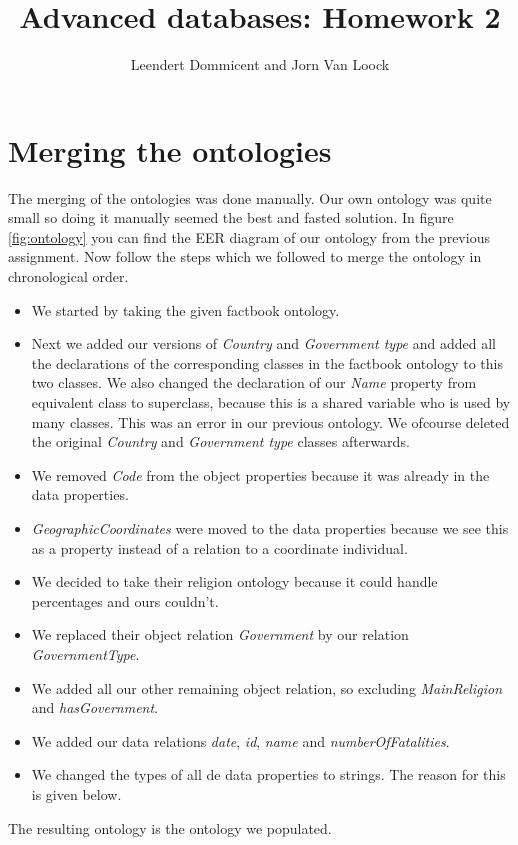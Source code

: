 \documentclass{article}
\title{Advanced databases: Homework 2}
\author{Leendert Dommicent and Jorn Van Loock}
\begin{document}
\maketitle
\section{Merging the ontologies}
The merging of the ontologies was done manually. Our own ontology was quite small so doing it manually seemed the best and fasted solution. In figure \ref{fig:ontology} you can find the EER diagram of our ontology from the previous assignment. Now follow the steps which we followed to merge the ontology in chronological order.
\begin{itemize}
\item We started by taking the given factbook ontology.
\item Next we added our versions of \textit{Country} and \textit{Government type} and added all the declarations of the corresponding classes in the factbook ontology to this two classes. We also changed the declaration of our \textit{Name} property from equivalent class to superclass, because this is a shared variable who is used by many classes. This was an error in our previous ontology. We ofcourse deleted the original \textit{Country} and \textit{Government type} classes afterwards.
\item We removed \textit{Code} from the object properties because it was already in the data properties.
\item \textit{GeographicCoordinates} were moved to the data properties because we see this as a property instead of a relation to a coordinate individual.
\item We decided to take their religion ontology because it could handle percentages and ours couldn't.
\item We replaced their object relation \textit{Government} by our relation \textit{GovernmentType}.
\item We added all our other remaining object relation, so excluding \textit{MainReligion} and \textit{hasGovernment}.
\item We added our data relations \textit{date}, \textit{id}, \textit{name} and \textit{numberOfFatalities}.
\item We changed the types of all de data properties to strings. The reason for this is given below.
\end{itemize}
The resulting ontology is the ontology we populated.
\end{document}
